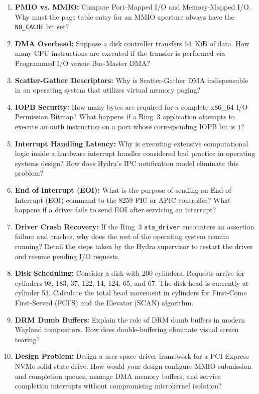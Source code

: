 \begin{enumerate}
    \item \textbf{PMIO vs. MMIO:} Compare Port-Mapped I/O and Memory-Mapped I/O. Why must the page table entry for an MMIO aperture always have the \texttt{NO\_CACHE} bit set?
    \item \textbf{DMA Overhead:} Suppose a disk controller transfers 64~KiB of data. How many CPU instructions are executed if the transfer is performed via Programmed I/O versus Bus-Master DMA?
    \item \textbf{Scatter-Gather Descriptors:} Why is Scatter-Gather DMA indispensable in an operating system that utilizes virtual memory paging?
    \item \textbf{IOPB Security:} How many bytes are required for a complete x86\_64 I/O Permission Bitmap? What happens if a Ring~3 application attempts to execute an \texttt{outb} instruction on a port whose corresponding IOPB bit is \texttt{1}?
    \item \textbf{Interrupt Handling Latency:} Why is executing extensive computational logic inside a hardware interrupt handler considered bad practice in operating systems design? How does Hydra's IPC notification model eliminate this problem?
    \item \textbf{End of Interrupt (EOI):} What is the purpose of sending an End-of-Interrupt (EOI) command to the 8259 PIC or APIC controller? What happens if a driver fails to send EOI after servicing an interrupt?
    \item \textbf{Driver Crash Recovery:} If the Ring~3 \texttt{ata\_driver} encounters an assertion failure and crashes, why does the rest of the operating system remain running? Detail the steps taken by the Hydra supervisor to restart the driver and resume pending I/O requests.
    \item \textbf{Disk Scheduling:} Consider a disk with 200 cylinders. Requests arrive for cylinders 98, 183, 37, 122, 14, 124, 65, and 67. The disk head is currently at cylinder 53. Calculate the total head movement in cylinders for First-Come First-Served (FCFS) and the Elevator (SCAN) algorithm.
    \item \textbf{DRM Dumb Buffers:} Explain the role of DRM dumb buffers in modern Wayland compositors. How does double-buffering eliminate visual screen tearing?
    \item \textbf{Design Problem:} Design a user-space driver framework for a PCI Express NVMe solid-state drive. How would your design configure MMIO submission and completion queues, manage DMA memory buffers, and service completion interrupts without compromising microkernel isolation?
\end{enumerate}
